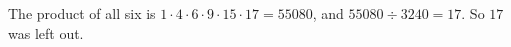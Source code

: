 The product of all six is $1\cdot4\cdot6\cdot9\cdot15\cdot17=55080$, and $55080\div3240=17$. So $\boxed{17}$ was left out.
